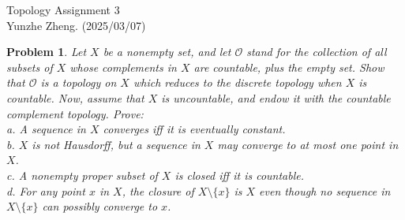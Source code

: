 \documentclass[12pt]{article}
\newtheorem{problem}{Problem}
\begin{document}
\noindent Topology \hfill Assignment 3\\
Yunzhe Zheng. (2025/03/07)

\hrulefill

\begin{problem}
Let $X$ be a nonempty set, and let $\mathcal{O}$ stand for the collection of all subsets of $X$ whose complements in $X$ are countable, plus the empty set. Show that $\mathcal{O}$ is a topology on $X$ which reduces to the discrete topology when $X$ is countable. Now, assume that $X$ is uncountable, and endow it with the countable complement topology. Prove: \\
\indent a. A sequence in $X$ converges iff it is eventually constant. \\
\indent b. $X$ is not Hausdorff, but a sequence in $X$ may converge to at most one point in $X$. \\
\indent c. A nonempty proper subset of $X$ is closed iff it is countable. \\
\indent d. For any point $x$ in $X$, the closure of $X\setminus \{x\}$ is $X$ even though no sequence in $X\setminus\{x\}$ can possibly converge to $x$.
\end{problem}
\end{document}
